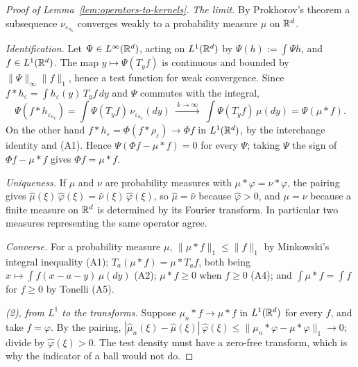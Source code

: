 \begin{proof}[Proof of Lemma~\ref{lem:operators-to-kernels}]
\emph{The limit.} By Prokhorov's theorem a subsequence $\nu_{\varepsilon_{n_k}}$ converges weakly
to a probability measure $\mu$ on $\mathbb{R}^d$.

\emph{Identification.} Let $\Psi \in L^\infty(\mathbb{R}^d)$, acting on $L^1(\mathbb{R}^d)$ by
$\Psi(h) := \int\Psi h$, and $f \in L^1(\mathbb{R}^d)$. The map $y \mapsto \Psi(T_yf)$ is continuous and
bounded by $\|\Psi\|_\infty\|f\|_1$, hence a test function for weak convergence. Since
$f * h_\varepsilon = \int h_\varepsilon(y)\,T_yf\,dy$ and $\Psi$ commutes with the integral,
\[
  \Psi(f * h_{\varepsilon_{n_k}}) = \int\Psi(T_yf)\,\nu_{\varepsilon_{n_k}}(dy)
  \ \xrightarrow{\ k \to \infty\ }\ \int\Psi(T_yf)\,\mu(dy) = \Psi(\mu * f) .
\]
On the other hand $f * h_\varepsilon = \Phi(f * \rho_\varepsilon) \to \Phi f$ in $L^1(\mathbb{R}^d)$, by
the interchange identity and (A1). Hence $\Psi(\Phi f - \mu * f) = 0$ for every $\Psi$; taking
$\Psi$ the sign of $\Phi f - \mu * f$ gives $\Phi f = \mu * f$.

\emph{Uniqueness.} If $\mu$ and $\nu$ are probability measures with
$\mu * \varphi = \nu * \varphi$, the pairing gives
$\widehat\mu(\xi)\,\widehat\varphi(\xi) = \widehat\nu(\xi)\,\widehat\varphi(\xi)$, so
$\widehat\mu = \widehat\nu$ because $\widehat\varphi > 0$, and $\mu = \nu$ because a finite measure
on $\mathbb{R}^d$ is determined by its Fourier transform. In particular two measures representing the
same operator agree.

\emph{Converse.} For a probability measure $\mu$, $\|\mu * f\|_1 \le \|f\|_1$ by Minkowski's
integral inequality (A1); $T_a(\mu * f) = \mu * T_af$, both being
$x \mapsto \int f(x - a - y)\,\mu(dy)$ (A2); $\mu * f \ge 0$ when $f \ge 0$ (A4); and
$\int\mu * f = \int f$ for $f \ge 0$ by Tonelli (A5).

\emph{(2), from $L^1$ to the transforms.} Suppose $\mu_n * f \to \mu * f$ in $L^1(\mathbb{R}^d)$ for
every $f$, and take $f = \varphi$. By the pairing,
$|\widehat\mu_n(\xi) - \widehat\mu(\xi)|\,\widehat\varphi(\xi)
\le \|\mu_n * \varphi - \mu * \varphi\|_1 \to 0$; divide by $\widehat\varphi(\xi) > 0$. The test
density must have a zero-free transform, which is why the indicator of a ball would not do.


\end{proof}
